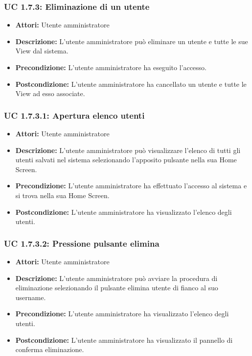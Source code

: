 \subsubsection{UC 1.7.3: Eliminazione di un utente}

\begin{itemize}
    \item \textbf{Attori:} Utente amministratore
    \item \textbf{Descrizione:} L'utente amministratore può eliminare un utente e tutte le sue View dal sistema.
    \item \textbf{Precondizione:} L'utente amministratore ha eseguito l'accesso.
    \item \textbf{Postcondizione:} L'utente amministratore ha cancellato un utente e tutte le View ad esso associate.
\end{itemize}

\subsubsection{UC 1.7.3.1: Apertura elenco utenti}

\begin{itemize}
    \item \textbf{Attori:} Utente amministratore
    \item \textbf{Descrizione:} L'utente amministratore può visualizzare l'elenco di tutti gli utenti salvati nel sistema selezionando l'apposito pulsante nella sua Home Screen.
    \item \textbf{Precondizione:} L'utente amministratore ha effettuato l'accesso al sistema e si trova nella sua Home Screen.
    \item \textbf{Postcondizione:} L'utente amministratore ha visualizzato l'elenco degli utenti.
\end{itemize}

\subsubsection{UC 1.7.3.2: Pressione pulsante elimina}

\begin{itemize}
    \item \textbf{Attori:} Utente amministratore
    \item \textbf{Descrizione:} L'utente amministratore può avviare la procedura di eliminazione selezionando il pulsante elimina utente di fianco al suo username.
    \item \textbf{Precondizione:} L'utente amministratore ha visualizzato l'elenco degli utenti.
    \item \textbf{Postcondizione:} L'utente amministratore ha visualizzato il pannello di conferma eliminazione.
\end{itemize}

